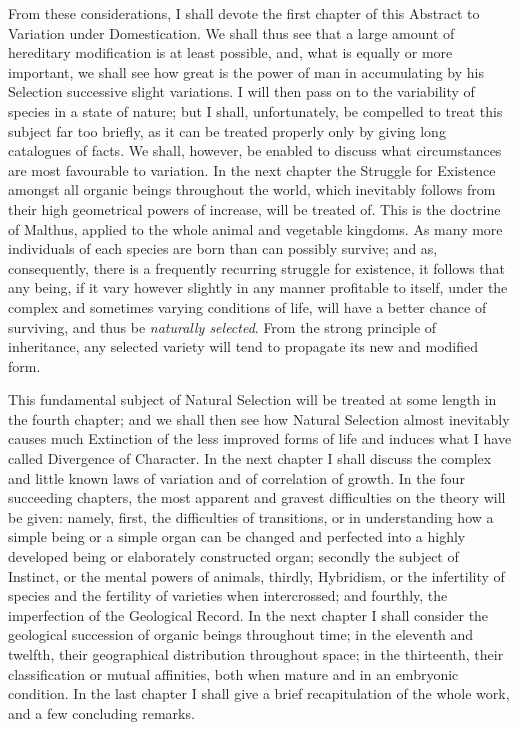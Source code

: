 \documentclass{book}
\begin{document}
From these considerations, I shall devote the first chapter of this Abstract to
Variation under Domestication. We shall thus see that a large amount of
hereditary modification is at least possible, and, what is equally or more
important, we shall see how great is the power of man in accumulating by his
Selection successive slight variations. I will then pass on to the variability
of species in a state of nature; but I shall, unfortunately, be compelled to
treat this subject far too briefly, as it can be treated properly only by
giving long catalogues of facts. We shall, however, be enabled to discuss what
circumstances are most favourable to variation. In the next chapter the
Struggle for Existence amongst all organic beings throughout the world, which
inevitably follows from their high geometrical powers of
increase, will be treated of. This is the doctrine of Malthus, applied to the
whole animal and vegetable kingdoms. As many more individuals of each species
are born than can possibly survive; and as, consequently, there is a frequently
recurring struggle for existence, it follows that any being, if it vary however
slightly in any manner profitable to itself, under the complex and sometimes
varying conditions of life, will have a better chance of surviving, and thus be
\emph{naturally selected}. From the strong principle of inheritance, any
selected variety will tend to propagate its new and modified form.

This fundamental subject of Natural Selection will be treated at some length in
the fourth chapter; and we shall then see how Natural Selection almost
inevitably causes much Extinction of the less improved forms of life and
induces what I have called Divergence of Character. In the next chapter I shall
discuss the complex and little known laws of variation and of correlation of
growth. In the four succeeding chapters, the most apparent and gravest
difficulties on the theory will be given: namely, first, the difficulties of
transitions, or in understanding how a simple being or a simple organ can be
changed and perfected into a highly developed being or elaborately constructed
organ; secondly the subject of Instinct, or the mental powers of animals,
thirdly, Hybridism, or the infertility of species and the fertility of
varieties when intercrossed; and fourthly, the imperfection of the Geological
Record. In the next chapter I shall consider the geological succession of
organic beings throughout time; in the eleventh and twelfth, their geographical
distribution throughout space; in the thirteenth, their classification or
mutual affinities, both when mature and in an embryonic condition. In the last
chapter I shall give a
brief recapitulation of the whole work, and a few concluding remarks.
\end{document}
